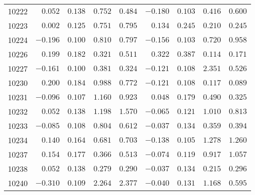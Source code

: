 \documentclass[6pt]{article}
\begin{document}
\begin{landscape}
{\begin{longtable}{lrrrrrrrr}
10222&$ 0.052$&$0.138$&$0.752$&$0.484$&$-0.180$&$0.103$&$0.416$&$0.600$\tabularnewline
10223&$ 0.002$&$0.125$&$0.751$&$0.795$&$ 0.134$&$0.245$&$0.210$&$0.245$\tabularnewline
10224&$-0.196$&$0.100$&$0.810$&$0.797$&$-0.156$&$0.103$&$0.720$&$0.958$\tabularnewline
10226&$ 0.199$&$0.182$&$0.321$&$0.511$&$ 0.322$&$0.387$&$0.114$&$0.171$\tabularnewline
10227&$-0.161$&$0.100$&$0.381$&$0.324$&$-0.121$&$0.108$&$2.351$&$0.526$\tabularnewline
10230&$ 0.200$&$0.184$&$0.988$&$0.772$&$-0.121$&$0.108$&$0.117$&$0.089$\tabularnewline
10231&$-0.096$&$0.107$&$1.160$&$0.923$&$ 0.048$&$0.179$&$0.490$&$0.325$\tabularnewline
10232&$ 0.052$&$0.138$&$1.198$&$1.570$&$-0.065$&$0.121$&$1.010$&$0.813$\tabularnewline
10233&$-0.085$&$0.108$&$0.804$&$0.612$&$-0.037$&$0.134$&$0.359$&$0.394$\tabularnewline
10234&$ 0.140$&$0.164$&$0.681$&$0.703$&$-0.138$&$0.105$&$1.278$&$1.260$\tabularnewline
10237&$ 0.154$&$0.177$&$0.366$&$0.513$&$-0.074$&$0.119$&$0.917$&$1.057$\tabularnewline
10238&$ 0.052$&$0.138$&$0.279$&$0.290$&$-0.037$&$0.134$&$0.215$&$0.296$\tabularnewline
10240&$-0.310$&$0.109$&$2.264$&$2.377$&$-0.040$&$0.131$&$1.168$&$0.595$\tabularnewline
\hline
\end{longtable}}\end{landscape}
\end{document}
